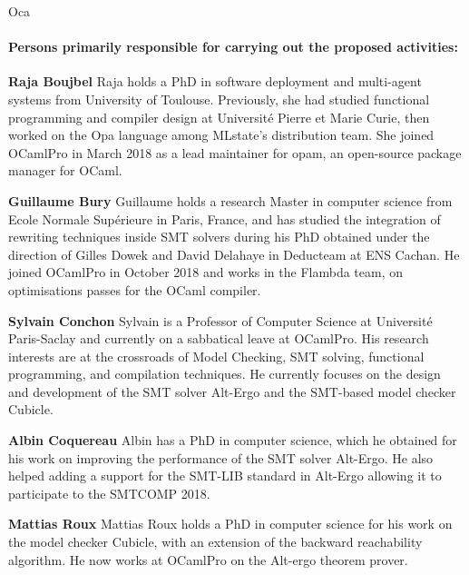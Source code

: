 \begin{sitedescription}{Oca}
\paragraph*{Persons primarily responsible for carrying out the proposed activities:}

\begin{compactitem} %
  \item{\bf Raja Boujbel} Raja holds a PhD in software deployment and
    multi-agent systems from University of Toulouse. Previously, she had studied
    functional programming and compiler design at Université Pierre et Marie
    Curie, then worked on the Opa language among MLstate’s distribution team.
    She joined OCamlPro in March 2018 as a lead maintainer for opam, an
    open-source package manager for OCaml.
\item{\bf Guillaume Bury} Guillaume holds a research Master in computer
    science from Ecole Normale Supérieure in Paris, France, and has studied the
    integration of rewriting techniques inside SMT solvers during his PhD
    obtained under the direction of Gilles Dowek and David Delahaye in
    Deducteam at ENS Cachan. He joined OCamlPro in October 2018 and works in
    the Flambda team, on optimisations passes for the OCaml compiler.
\item{\bf Sylvain Conchon} Sylvain is a Professor of Computer
    Science at Université Paris-Saclay and currently on a sabbatical
    leave at OCamlPro. His research interests are at the crossroads of
    Model Checking, SMT solving, functional programming, and
    compilation techniques. He currently focuses on the design and
    development of the SMT solver Alt-Ergo and the SMT-based model
    checker Cubicle.
\item{\bf Albin Coquereau} Albin has a PhD in computer science,
    which he obtained for his work on improving the performance of the SMT
    solver Alt-Ergo. He also helped adding a support for the SMT-LIB standard
    in Alt-Ergo allowing it to participate to the SMTCOMP 2018.
\item{\bf Mattias Roux} Mattias Roux holds a PhD in computer science
    for his work on the model checker Cubicle, with an extension of the backward
    reachability algorithm. He now works at OCamlPro on the Alt-ergo theorem
    prover.
\end{compactitem}

\end{sitedescription}

